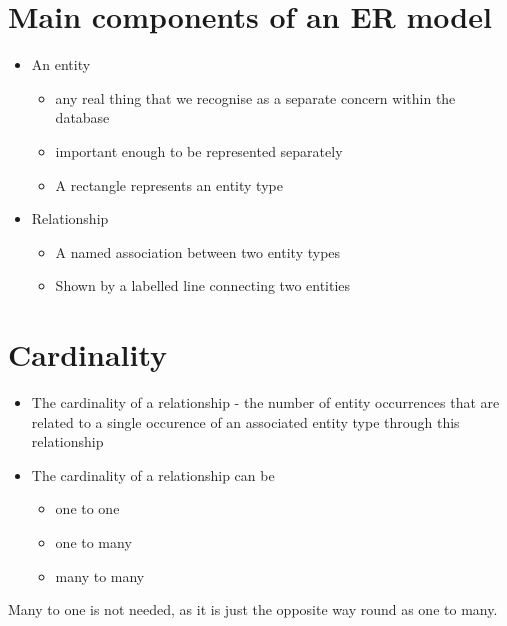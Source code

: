\documentclass{article}[18pt]
\begin{document}
\section{Main components of an ER model}
\begin{itemize}
	\item An entity
	\begin{itemize}
		\item any real thing that we recognise as a separate concern within the database
		\item important enough to be represented separately
		\item A rectangle represents an entity type
	\end{itemize}
	\item Relationship
	\begin{itemize}
		\item A named association between two entity types
		\item Shown by a labelled line connecting two entities 
	\end{itemize}
\end{itemize}
\section{Cardinality}
\begin{itemize}
	\item The cardinality of a relationship - the number of entity occurrences that are related to a single occurence of an associated entity type through this relationship
	\item The cardinality of a relationship can be
	\begin{itemize}
		\item one to one
		\item one to many
		\item many to many
	\end{itemize}
\end{itemize}
Many to one is not needed, as it is just the opposite way round as one to many.
\end{document}
